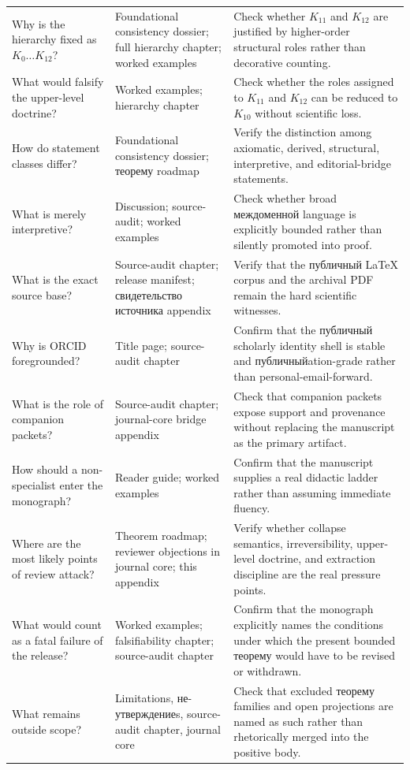 \begin{longtable}{p{3.4cm} p{4.4cm} p{5.7cm}}
Why is the hierarchy fixed as \(K_0\dots K_{12}\)? & Foundational consistency dossier; full hierarchy chapter; worked examples & Check whether \(K_{11}\) and \(K_{12}\) are justified by higher-order structural roles rather than decorative counting. \\
What would falsify the upper-level doctrine? & Worked examples; hierarchy chapter & Check whether the roles assigned to \(K_{11}\) and \(K_{12}\) can be reduced to \(K_{10}\) without scientific loss. \\
How do statement classes differ? & Foundational consistency dossier; теорему roadmap & Verify the distinction among axiomatic, derived, structural, interpretive, and editorial-bridge statements. \\
What is merely interpretive? & Discussion; source-audit; worked examples & Check whether broad междоменной language is explicitly bounded rather than silently promoted into proof. \\
What is the exact source base? & Source-audit chapter; release manifest; свидетельство источника appendix & Verify that the публичный LaTeX corpus and the archival PDF remain the hard scientific witnesses. \\
Why is ORCID foregrounded? & Title page; source-audit chapter & Confirm that the публичный scholarly identity shell is stable and публичныйation-grade rather than personal-email-forward. \\
What is the role of companion packets? & Source-audit chapter; journal-core bridge appendix & Check that companion packets expose support and provenance without replacing the manuscript as the primary artifact. \\
How should a non-specialist enter the monograph? & Reader guide; worked examples & Confirm that the manuscript supplies a real didactic ladder rather than assuming immediate fluency. \\
Where are the most likely points of review attack? & Theorem roadmap; reviewer objections in journal core; this appendix & Verify whether collapse semantics, irreversibility, upper-level doctrine, and extraction discipline are the real pressure points. \\
What would count as a fatal failure of the release? & Worked examples; falsifiability chapter; source-audit chapter & Confirm that the monograph explicitly names the conditions under which the present bounded теорему would have to be revised or withdrawn. \\
What remains outside scope? & Limitations, не-утверждениеs, source-audit chapter, journal core & Check that excluded теорему families and open projections are named as such rather than rhetorically merged into the positive body. \\
\end{longtable}

